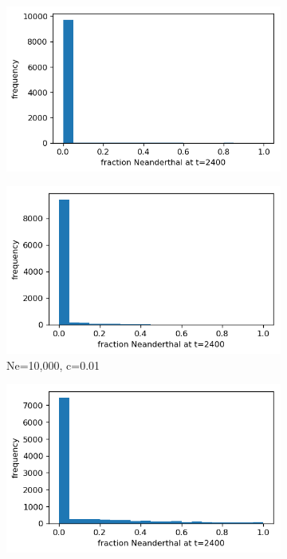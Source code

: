 \documentclass{article}
\begin{document}
\begin{figure}[h]
	\centering
	\begin{subfigure}[t]{0.24\linewidth}
		\centering
		\includegraphics[width = 1.0\linewidth, trim={0 0 0 0}, clip=true]{figures/Ne3400_c01_histfrac.png}
	\end{subfigure}
	\hspace{0.0\linewidth}
	\begin{subfigure}[t]{0.24\linewidth}
		\centering
		\includegraphics[width = 1.0\linewidth, trim={0 0 0 0}, clip=true]{figures/Ne10000_c01_histfrac.png}
		\caption{Ne=10,000, c=0.01}
	\end{subfigure}
	\hspace{0.0\linewidth}
	\begin{subfigure}[t]{0.24\linewidth}
		\centering
		\includegraphics[width = 1.0\linewidth, trim={0 0 0 0}, clip=true]{figures/Ne3400_c1_histfrac.png}

\end{subfigure}
\end{figure}
\end{document}
